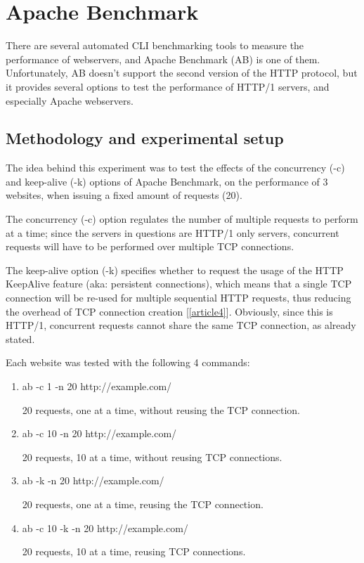 \documentclass[a4paper,10pt]{article}
\begin{document}
\section{Apache Benchmark}

There are several automated CLI benchmarking tools to measure the performance of webservers, and Apache Benchmark (AB) is one of them. Unfortunately, AB doesn't support the second version of the HTTP protocol, but it provides several options to test the performance of HTTP/1 servers, and especially Apache webservers.

\subsection{Methodology and experimental setup}

The idea behind this experiment was to test the effects of the concurrency (-c) and keep-alive (-k) options of Apache Benchmark, on the performance of 3 websites, when issuing a fixed amount of requests (20). 

The concurrency (-c) option regulates the number of multiple requests to perform at a time; since the servers in questions are HTTP/1 only servers, concurrent requests will have to be performed over multiple TCP connections. 

The keep-alive option (-k) specifies whether to request the usage of the HTTP KeepAlive feature (aka: persistent connections), which means that a single TCP connection will be re-used for multiple sequential HTTP requests, thus reducing the overhead of TCP connection creation [\ref{article4}]. Obviously, since this is HTTP/1, concurrent requests cannot share the same TCP connection, as already stated.


Each website was tested with the following 4 commands:


\begin{enumerate}


\item ab -c 1 -n 20 http://example.com/

20 requests, one at a time, without reusing the TCP connection.

\item ab -c 10 -n 20 http://example.com/

20 requests, 10 at a time, without reusing TCP connections.

\item ab -k -n 20 http://example.com/

20 requests, one at a time, reusing the TCP connection.


\item ab -c 10 -k -n 20 http://example.com/

20 requests, 10 at a time, reusing TCP connections.


\end{enumerate}
\end{document}
